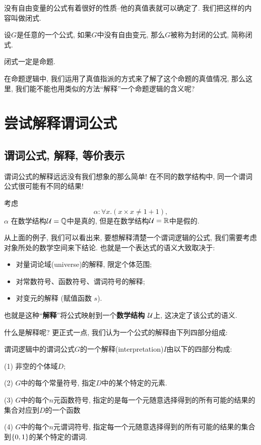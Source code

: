 没有自由变量的公式有着很好的性质--他的真值表就可以确定了. 我们把这样的内容叫做闭式. 

\begin{definition}[闭式]
设$G$是任意的一个公式, 如果$G$中没有自由变元, 那么$G$被称为封闭的公式, 简称闭式. 	
\end{definition}

\begin{theorem}
	闭式一定是命题. 
\end{theorem}

在命题逻辑中, 我们运用了真值指派的方式来了解了这个命题的真值情况, 那么这里, 我们能不能也用类似的方法``解释''一个命题逻辑的含义呢? 

\section{尝试解释谓词公式}
\subsection{谓词公式, 解释, 等价表示}
谓词公式的解释远远没有我们想象的那么简单! 在不同的数学结构中, 同一个谓词公式很可能有不同的结果! 

\begin{example}
	考虑
	$$
	\alpha: \forall x.(x\times x \neq 1+1), 
	$$
	$\alpha$ 在数学结构$\mathcal U=\mathbb{Q} $中是真的, 但是在数学结构$\mathcal U=\mathbb{R}  $中是假的. 
\end{example}

从上面的例子, 我们可以看出来, 要想解释清楚一个谓词逻辑的公式, 我们需要考虑对象所处的数学空间来下结论. 也就是一个表达式的语义大致取决于: 

\begin{itemize}
  \item 对量词论域(universe)的解释, 限定个体范围;
  \item 对常数符号、函数符号、谓词符号的解释;
  \item 对变元的解释 (赋值函数 $s$).
\end{itemize}

也就是这种``{\bf 解释}''将公式映射到一个{\bf 数学结构 $\mathcal{U}$}上, 这决定了该公式的语义. 

什么是解释呢? 更正式一点, 我们认为一个公式的解释由下列四部分组成: 

\begin{definition}
	谓词逻辑中的谓词公式$G$的一个解释(interpretation)$I$由以下的四部分构成: 
	
	(1) 非空的个体域$D$;
	
	(2) $G$中的每个常量符号, 指定$D$中的某个特定的元素. 
	
	(3) $G$中的每个$n$元函数符号, 指定的是每一个元随意选择得到的所有可能的结果的集合对应到$D$的一个函数
	
	(4) $G$中的每个$n$元谓词符号, 指定每一个元随意选择得到的所有可能的结果的集合到$\{0,1\}$的某个特定的谓词. 
\end{definition}

